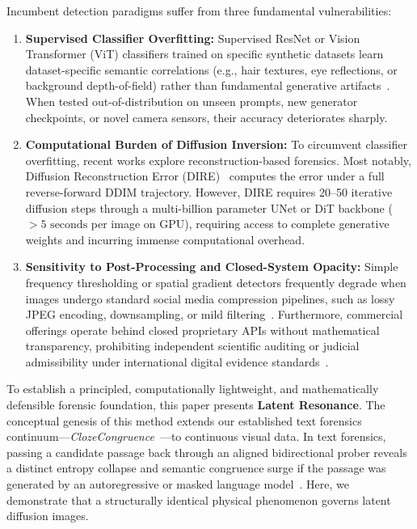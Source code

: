 \documentclass[11pt]{article}
\theoremstyle{definition}
\begin{document}
Incumbent detection paradigms suffer from three fundamental vulnerabilities:
\begin{enumerate}
    \item \textbf{Supervised Classifier Overfitting:} Supervised ResNet or Vision Transformer (ViT) classifiers trained on specific synthetic datasets learn dataset-specific semantic correlations (e.g., hair textures, eye reflections, or background depth-of-field) rather than fundamental generative artifacts~\citep{wang2020cnn,ojha2023towards}. When tested out-of-distribution on unseen prompts, new generator checkpoints, or novel camera sensors, their accuracy deteriorates sharply.
    \item \textbf{Computational Burden of Diffusion Inversion:} To circumvent classifier overfitting, recent works explore reconstruction-based forensics. Most notably, Diffusion Reconstruction Error (DIRE)~\citep{wang2023dire} computes the error under a full reverse-forward DDIM trajectory. However, DIRE requires 20--50 iterative diffusion steps through a multi-billion parameter UNet or DiT backbone ($>5\text{ seconds}$ per image on GPU), requiring access to complete generative weights and incurring immense computational overhead.
    \item \textbf{Sensitivity to Post-Processing and Closed-System Opacity:} Simple frequency thresholding or spatial gradient detectors frequently degrade when images undergo standard social media compression pipelines, such as lossy JPEG encoding, downsampling, or mild filtering~\citep{corvi2023detection}. Furthermore, commercial offerings operate behind closed proprietary APIs without mathematical transparency, prohibiting independent scientific auditing or judicial admissibility under international digital evidence standards~\citep{iso27037}.
\end{enumerate}

To establish a principled, computationally lightweight, and mathematically defensible forensic foundation, this paper presents \textbf{Latent Resonance}. The conceptual genesis of this method extends our established text forensics continuum---\textit{ClozeCongruence}~\citep{bandyopadhyay2026cloze1,bandyopadhyay2026dna,bandyopadhyay2026scaling,bandyopadhyay2026cloze3}---to continuous visual data. In text forensics, passing a candidate passage back through an aligned bidirectional prober reveals a distinct entropy collapse and semantic congruence surge if the passage was generated by an autoregressive or masked language model~\citep{bandyopadhyay2026cloze1}. Here, we demonstrate that a structurally identical physical phenomenon governs latent diffusion images.
\end{document}
